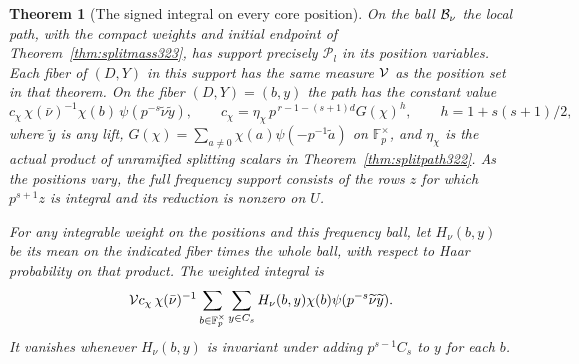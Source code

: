 \documentclass[a4paper,11pt]{article}
\newtheorem{theorem}[proposition]{Theorem}
\theoremstyle{definition}
\theoremstyle{remark}
\numberwithin{equation}{section}
\begin{document}
\begin{theorem}[The signed integral on every core position]\leavevmode
\label{thm:signedfibers331}
On the ball \({\cal B}_\nu\) the local path, with the compact
weights and initial endpoint of Theorem~\ref{thm:splitmass323},
has support precisely \(\mathcal P_l\) in its position variables.
Each fiber of \((D,Y)\) in this support has the same measure
\({\cal V}\) as the position set in that theorem. On the fiber
\((D,Y)=(b,y)\) the path has the constant value
\[
    c_\chi\,\chi(\bar\nu)^{-1}\chi(b)\,\psi(p^{-s}\widetilde\nu\widetilde y),
    \qquad
    c_\chi=\eta_\chi\,p^{\,r-1-(s+1)d}G(\chi)^h,\qquad
    h=1+s(s+1)/2 ,
\]
where \(\widetilde y\) is any lift,
\(G(\chi)=\sum_{a\ne0}\chi(a)\psi(-p^{-1}\widetilde a)\)
on \(\mathbb F_p^\times\), and \(\eta_\chi\) is the actual product
of unramified splitting scalars in Theorem~\ref{thm:splitpath322}.
As the positions vary, the full frequency support consists of the
rows \(z\) for which \(p^{s+1}z\) is integral and its reduction
is nonzero on \(U\).

For any integrable weight on the positions and this frequency ball,
let \(H_\nu(b,y)\) be its mean on the indicated fiber times the
whole ball, with respect to Haar probability on that product. The
weighted integral is
\begin{equation}\label{eq:signedfibers331}
 {\cal V} c_\chi\,\chi(\bar\nu)^{-1}
  \sum_{b\in\mathbb F_p^\times}\sum_{y\in C_s}
  H_\nu(b,y)\chi(b)\psi(p^{-s}\widetilde\nu\widetilde y).
\end{equation}
It vanishes whenever \(H_\nu(b,y)\) is invariant under adding
\(p^{s-1}C_s\) to \(y\) for each \(b\).
\end{theorem}
\end{document}
